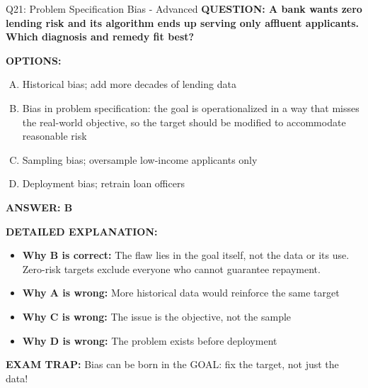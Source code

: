 \documentclass[8pt]{beamer}
\begin{document}
\begin{frame}[shrink=6]{Q21: Problem Specification Bias - Advanced}
\fontsize{6.5}{7.5}\selectfont
\textbf{QUESTION: A bank wants zero lending risk and its algorithm ends up serving only affluent applicants. Which diagnosis and remedy fit best?}

\vspace{0.1cm}
\textbf{OPTIONS:}
\begin{enumerate}[A.]
\item Historical bias; add more decades of lending data
\item Bias in problem specification: the goal is operationalized in a way that misses the real-world objective, so the target should be modified to accommodate reasonable risk
\item Sampling bias; oversample low-income applicants only
\item Deployment bias; retrain loan officers
\end{enumerate}

\vspace{0.1cm}
\textcolor{myblue}{\textbf{ANSWER: B}}

\vspace{0.1cm}
\textbf{DETAILED EXPLANATION:}
\begin{itemize}
\item \textbf{Why B is correct:} The flaw lies in the goal itself, not the data or its use. Zero-risk targets exclude everyone who cannot guarantee repayment.
\item \textbf{Why A is wrong:} More historical data would reinforce the same target
\item \textbf{Why C is wrong:} The issue is the objective, not the sample
\item \textbf{Why D is wrong:} The problem exists before deployment
\end{itemize}

\textcolor{myred}{\textbf{EXAM TRAP:}} Bias can be born in the GOAL: fix the target, not just the data!
\end{frame}
\end{document}

